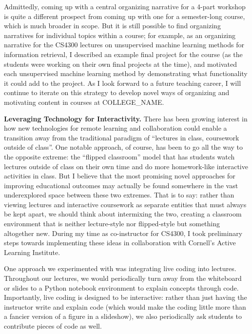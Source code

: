 \documentclass[11pt,letterpaper]{article}
\renewcommand{\section}[1]{\vspace{0.25\baselineskip}\noindent\textbf{#1.}}
\newcommand{\schoolname}{COLLEGE\_NAME}
\begin{document}
Admittedly, coming up with a central organizing narrative for a 4-part workshop is quite a different prospect from coming up with one for a semester-long course, which is much broader in scope.
But it is still possible to find organizing narratives for individual topics within a course; for example, as an organizing narrative for the CS4300 lectures on unsupervised machine learning methods for information retrieval, I described an example final project for the course (as the students were working on their own final projects at the time), and motivated each unsupervised machine learning method by demonstrating what functionality it could add to the project.  
As I look forward to a future teaching career, I will continue to iterate on this strategy to develop novel ways of organizing and motivating content in courses at \schoolname.

\section{Leveraging Technology for Interactivity}
There has been growing interest in how new technologies for remote learning and collaboration could enable a transition away from the traditional paradigm of ``lectures in class, coursework outside of class''.
One notable approach, of course, has been to go all the way to the opposite extreme: the ``flipped classroom'' model that has students watch lectures outside of class on their own time and do more homework-like interactive activities in class.
But I believe that the most promising novel approaches for improving educational outcomes may actually be found somewhere in the vast underexplored space between these two extremes.
That is to say: rather than viewing lectures and interactive coursework as separate entities that must always be kept apart, we should think about intermixing the two, creating a classroom environment that is neither lecture-style nor flipped-style but something altogether new.
During my time as co-instructor for CS4300, I took preliminary steps towards implementing these ideas in collaboration with Cornell's Active Learning Institute.

One approach we experimented with was integrating live coding into lectures.
Throughout our lectures, we would periodically turn away from the whiteboard or slides to a Python notebook environment to explain concepts through code.
Importantly, live coding is designed to be interactive: rather than just having the instructor write and explain code (which would make the coding little more than a fancier version of a figure in a slideshow), we also periodically ask students to contribute pieces of code as well.
\end{document}
